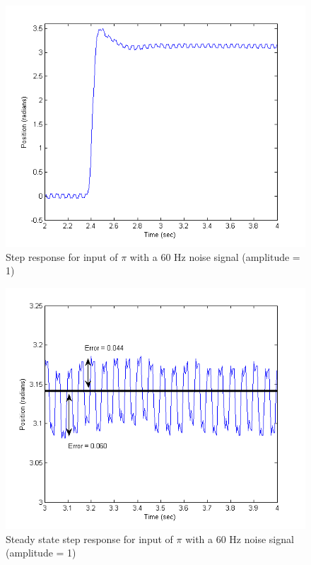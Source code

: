 \documentclass[letterpaper]{article}
\begin{document}
\begin{figure}[H]
\begin{center}
\includegraphics[scale=0.5]{PosNoise.png}
\caption{Step response for input of $\pi$ with a 60 Hz noise signal (amplitude = 1)}
\label{PosNoise}
\end{center}
\end{figure}

\begin{figure}[H]
\begin{center}
\includegraphics[scale=0.5]{PosNoiseZoom.png}
\caption{Steady state step response for input of $\pi$ with a 60 Hz noise signal (amplitude = 1)}
\label{PosNoiseZoom}
\end{center}
\end{figure}
\end{document}
